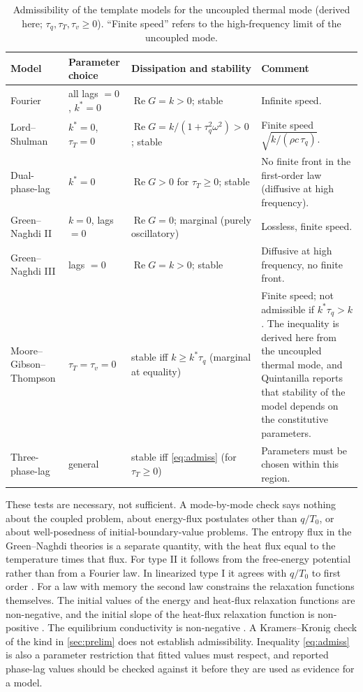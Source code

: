 \begin{table}[ht]\centering\small
\caption{Admissibility of the template models for the uncoupled thermal mode (derived here; $\tau_q,\tau_T,\tau_v\ge0$). ``Finite speed'' refers to the high-frequency limit of the uncoupled mode.}\label{tab:admiss}
\begin{tabularx}{\textwidth}{@{}p{2.3cm}p{3.0cm}p{3.6cm}X@{}}\toprule
Model & Parameter choice & Dissipation and stability & Comment\\\midrule
Fourier & all lags $=0$, $k^*=0$ & $\operatorname{Re}G=k>0$; stable & Infinite speed.\\
Lord--Shulman & $k^*=0$, $\tau_T=0$ & $\operatorname{Re}G=k/(1+\tau_q^2\omega^2)>0$; stable & Finite speed $\sqrt{k/(\rho c\,\tau_q)}$.\\
Dual-phase-lag & $k^*=0$ & $\operatorname{Re}G>0$ for $\tau_T\ge0$; stable & No finite front in the first-order law (diffusive at high frequency).\\
Green--Naghdi II & $k=0$, lags $=0$ & $\operatorname{Re}G=0$; marginal (purely oscillatory) & Lossless, finite speed.\\
Green--Naghdi III & lags $=0$ & $\operatorname{Re}G=k>0$; stable & Diffusive at high frequency, no finite front.\\
Moore--Gibson--Thompson & $\tau_T=\tau_v=0$ & stable iff $k\ge k^*\tau_q$ (marginal at equality) & Finite speed; not admissible if $k^*\tau_q>k$. The inequality is derived here from the uncoupled thermal mode, and Quintanilla \citep{Quintanilla2019} reports that stability of the model depends on the constitutive parameters.\\
Three-phase-lag & general & stable iff \eqref{eq:admiss} (for $\tau_T\ge0$) & Parameters must be chosen within this region.\\
\bottomrule\end{tabularx}
\end{table}

These tests are necessary, not sufficient. A mode-by-mode check says nothing about the coupled problem, about energy-flux postulates other than $q/T_0$, or about well-posedness of initial-boundary-value problems. The entropy flux in the Green--Naghdi theories is a separate quantity, with the heat flux equal to the temperature times that flux. For type II it follows from the free-energy potential rather than from a Fourier law. In linearized type I it agrees with $q/T_0$ to first order \citep{Green1993}. For a law with memory the second law constrains the relaxation functions themselves. The initial values of the energy and heat-flux relaxation functions are non-negative, and the initial slope of the heat-flux relaxation function is non-positive \citep{ChenNunziato1974}. The equilibrium conductivity is non-negative \citep{ChenNunziato1974}. A Kramers--Kronig check of the kind in \cref{sec:prelim} does not establish admissibility. Inequality \eqref{eq:admiss} is also a parameter restriction that fitted values must respect, and reported phase-lag values should be checked against it before they are used as evidence for a model.
